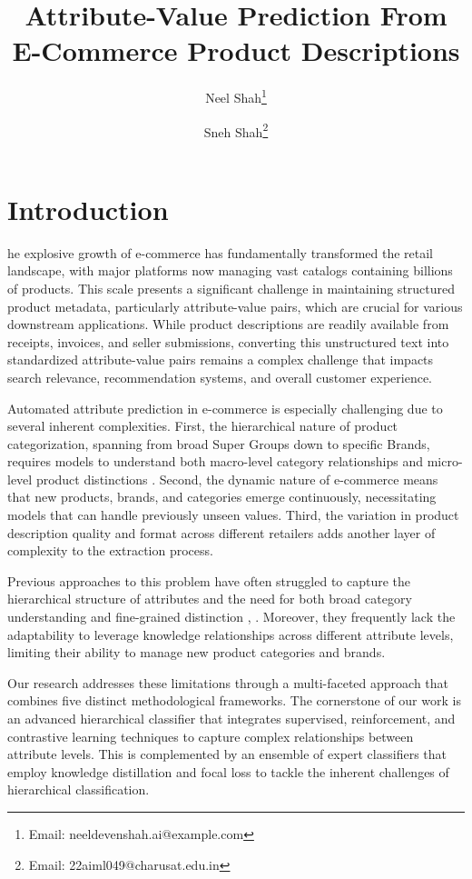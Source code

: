 \documentclass[9pt,a4paper,twoside]{rho-class/rho}
\title{Attribute-Value Prediction From E-Commerce Product Descriptions}
\author[1,$\dagger$]{Neel Shah\thanks{Email: neeldevenshah.ai@example.com}}
\author[1,$\dagger$]{Sneh Shah\thanks{Email: 22aiml049@charusat.edu.in}}
\affil[1]{Charotar University of Science and Technology }
\affil[$\dagger$]{These authors contributed equally to this work}
\begin{document}
	
    \maketitle
    \thispagestyle{firststyle}
    \nolinenumbers


\section{Introduction}

    he explosive growth of e-commerce has fundamentally transformed the retail landscape, with major platforms now managing vast catalogs containing billions of products. This scale presents a significant challenge in maintaining structured product metadata, particularly attribute-value pairs, which are crucial for various downstream applications. While product descriptions are readily available from receipts, invoices, and seller submissions, converting this unstructured text into standardized attribute-value pairs remains a complex challenge that impacts search relevance, recommendation systems, and overall customer experience.

    Automated attribute prediction in e-commerce is especially challenging due to several inherent complexities. First, the hierarchical nature of product categorization, spanning from broad Super Groups down to specific Brands, requires models to understand both macro-level category relationships and micro-level product distinctions \cite{harshika2017approach}. Second, the dynamic nature of e-commerce means that new products, brands, and categories emerge continuously, necessitating models that can handle previously unseen values. Third, the variation in product description quality and format across different retailers adds another layer of complexity to the extraction process.
    
    Previous approaches to this problem have often struggled to capture the hierarchical structure of attributes and the need for both broad category understanding and fine-grained distinction \cite{harshika2017approach}, \cite{trietsch2016product}. Moreover, they frequently lack the adaptability to leverage knowledge relationships across different attribute levels, limiting their ability to manage new product categories and brands.
    
    Our research addresses these limitations through a multi-faceted approach that combines five distinct methodological frameworks. The cornerstone of our work is an advanced hierarchical classifier that integrates supervised, reinforcement, and contrastive learning techniques to capture complex relationships between attribute levels. This is complemented by an ensemble of expert classifiers that employ knowledge distillation and focal loss to tackle the inherent challenges of hierarchical classification.
    
\end{document}
